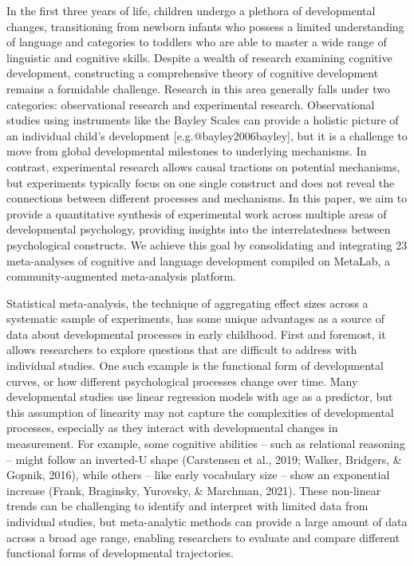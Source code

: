\documentclass[10pt, letterpaper]{article}
\begin{document}
In the first three years of life, children undergo a plethora of
developmental changes, transitioning from newborn infants who possess a
limited understanding of language and categories to toddlers who are
able to master a wide range of linguistic and cognitive skills. Despite
a wealth of research examining cognitive development, constructing a
comprehensive theory of cognitive development remains a formidable
challenge. Research in this area generally falls under two categories:
observational research and experimental research. Observational studies
using instruments like the Bayley Scales can provide a holistic picture
of an individual child's development {[}e.g.@bayley2006bayley{]}, but it
is a challenge to move from global developmental milestones to
underlying mechanisms. In contrast, experimental research allows causal
tractions on potential mechanisms, but experiments typically focus on
one single construct and does not reveal the connections between
different processes and mechanisms. In this paper, we aim to provide a
quantitative synthesis of experimental work across multiple areas of
developmental psychology, providing insights into the interrelatedness
between psychological constructs. We achieve this goal by consolidating
and integrating 23 meta-analyses of cognitive and language development
compiled on MetaLab, a community-augmented meta-analysis platform.

Statistical meta-analysis, the technique of aggregating effect sizes
across a systematic sample of experiments, has some unique advantages as
a source of data about developmental processes in early childhood. First
and foremost, it allows researchers to explore questions that are
difficult to address with individual studies. One such example is the
functional form of developmental curves, or how different psychological
processes change over time. Many developmental studies use linear
regression models with age as a predictor, but this assumption of
linearity may not capture the complexities of developmental processes,
especially as they interact with developmental changes in measurement.
For example, some cognitive abilities -- such as relational reasoning --
might follow an inverted-U shape (Carstensen et al., 2019; Walker,
Bridgers, \& Gopnik, 2016), while others -- like early vocabulary size
-- show an exponential increase (Frank, Braginsky, Yurovsky, \&
Marchman, 2021). These non-linear trends can be challenging to identify
and interpret with limited data from individual studies, but
meta-analytic methods can provide a large amount of data across a broad
age range, enabling researchers to evaluate and compare different
functional forms of developmental trajectories.
\end{document}

